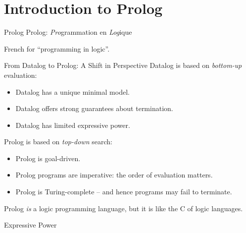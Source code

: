 

\section{Introduction to Prolog}

\begin{frame}{Prolog}
\Large
Prolog: \emph{Pro}grammation en \emph{Log}ique

\bigskip

\normalsize
French for ``programming in logic''.
\end{frame}    

\begin{frame}{From Datalog to Prolog: A Shift in Perspective}
Datalog is based on \emph{bottom-up} evaluation:

\begin{itemize}
    \item Datalog has a unique minimal model.
    \item Datalog offers strong guarantees about termination.
    \item Datalog has limited expressive power.
\end{itemize}

Prolog is based on \emph{top-down} search:

\begin{itemize}
    \item Prolog is goal-driven.
    \item Prolog programs are imperative: the order of evaluation matters.
    \item Prolog is Turing-complete -- and hence programs may fail to terminate.
\end{itemize}

\pause

Prolog \emph{is} a logic programming language, but it is like the C of logic languages.
\end{frame}

\begin{frame}{Expressive Power}
\centering
\medskip
\medskip
{}
\end{frame}

